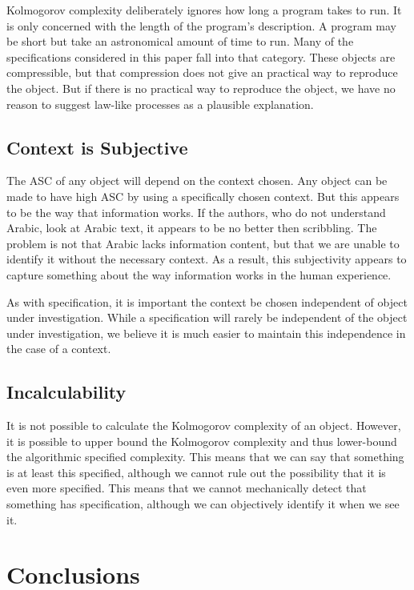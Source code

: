 Kolmogorov complexity deliberately ignores how long a program takes to run.
It is only concerned with the length of the program's description.
A program may be short but take an astronomical amount of time to run.
Many of the specifications considered in this paper fall into that category.
These objects are compressible, but that compression does not give an practical way to reproduce the object.
But if there is no practical way to reproduce the object, we have no reason to suggest law-like processes as a plausible explanation.

\subsection{Context is Subjective}
The ASC of any object will depend on the context chosen.
Any object can be made to have high ASC by using a specifically chosen context.
But this appears to be the way that information works.
If the authors, who do not understand Arabic, look at Arabic text, it appears to be no better then scribbling.
The problem is not that Arabic lacks information content, but that we are unable to identify it without the necessary context.
As a result, this subjectivity appears to capture something about the way information works in the human experience.

As with specification, it is important the context be chosen independent of object under investigation.
While a specification will rarely be independent of the object under investigation, we believe it is much easier to maintain this independence in the case of a context.

\subsection{Incalculability}
It is not possible to calculate the Kolmogorov complexity of an object.
However, it is possible to upper bound the Kolmogorov complexity and thus lower-bound the algorithmic specified complexity.
This means that we can say that something is at least this specified, although we cannot rule out the possibility that it is even more specified.
This means that we cannot mechanically detect that something has specification, although we can objectively identify it when we see it.

\section{Conclusions}

